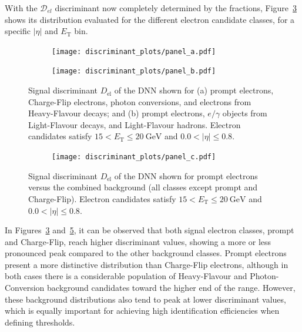 With the $ \mathcal{D}_{el} $ discriminant now completely determined by the fractions, Figure~\ref{fig:dnn_final_disc_ab} shows its distribution evaluated for the different electron candidate classes, for a specific $|\eta|$ and $E_{\text{T}}$ bin.
\begin{figure}[htbp]
  \centering
  \begin{subfigure}[t]{0.48\linewidth}
    \centering
    \texttt{[image: discriminant\_plots/panel\_a.pdf]}
    \caption{}
    \label{fig:dnnDisc_a}
  \end{subfigure}\hfill
  \begin{subfigure}[t]{0.48\linewidth}
    \centering
    \texttt{[image: discriminant\_plots/panel\_b.pdf]}
    \caption{}
    \label{fig:dnnDisc_b}
  \end{subfigure}

  \caption{Signal discriminant $D_{\mathrm{el}}$ of the DNN shown for (a) prompt electrons,
  Charge-Flip electrons, photon conversions, and electrons from Heavy-Flavour decays; and
  (b) prompt electrons, $e/\gamma$ objects from Light-Flavour decays, and Light-Flavour hadrons.
  Electron candidates satisfy $15<E_{\text{T}}\leq 20~\mathrm{GeV}$ and $0.0<|\eta|\leq 0.8$.}
  \label{fig:dnn_final_disc_ab}
\end{figure}

\begin{figure}[htbp]
  \centering
  \begin{subfigure}[t]{0.60\linewidth}
    \centering
    \texttt{[image: discriminant\_plots/panel\_c.pdf]}
    \label{fig:dnnDisc_c}
  \end{subfigure}

  \caption{Signal discriminant $D_{\mathrm{el}}$ of the DNN shown for prompt electrons versus
  the combined background (all classes except prompt and Charge-Flip).
  Electron candidates satisfy $15<E_{\text{T}}\leq 20~\mathrm{GeV}$ and $0.0<|\eta|\leq 0.8$.}
  \label{fig:dnn_final_disc_c}
\end{figure}



In Figures~\ref{fig:dnn_final_disc_ab} and~\ref{fig:dnn_final_disc_c}, it can be observed that both signal electron classes, prompt and Charge-Flip, reach higher discriminant values, showing a more or less pronounced peak compared to the other background classes. Prompt electrons present a more distinctive distribution than Charge-Flip electrons, although in both cases there is a considerable population of Heavy-Flavour and Photon-Conversion background candidates toward the higher end of the range. However, these background distributions also tend to peak at lower discriminant values, which is equally important for achieving high identification efficiencies when defining thresholds.

